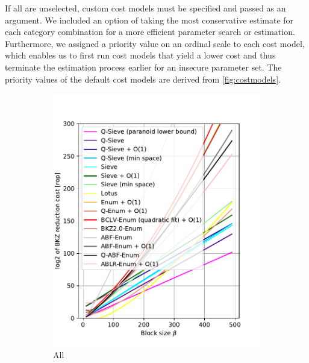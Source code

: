 If all are unselected, custom cost models must be specified and passed as an argument. We included an option of taking the most conservative estimate for each category combination for a more efficient parameter search or estimation. Furthermore, we assigned a priority value on an ordinal scale to each cost model, which enables us to first run cost models that yield a lower cost and thus terminate the estimation process earlier for an insecure parameter set. The priority values of the default cost models are derived from \cref{fig:costmodels}.
\begin{figure}[h!]
    \centering
    \begin{subfigure}{0.5\textwidth}
        \centering
        \includegraphics[width=1\textwidth]{graphics/cost_models.pdf}
        \caption{All}
    \end{subfigure}
    \begin{subfigure}{0.49\textwidth}
        \centering

\end{subfigure}
\end{figure}
